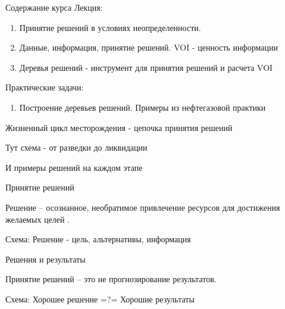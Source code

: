 \begin{frame}
    \titlepage
\end{frame}

\begin{frame}{Содержание курса}
Лекция:
\begin{enumerate}
    \item Принятие решений в условиях неопределенности. 
    \item Данные, информация, принятие решений. VOI - ценность информации
    \item Деревья решений - инструмент для принятия решений и расчета VOI
\end{enumerate}
Практические задачи:
\begin{enumerate}
	\item Построение деревьев решений. Примеры из нефтегазовой практики
\end{enumerate}
\end{frame}

\begin{frame}{Жизненный цикл месторождения - цепочка принятия решений}
	
	Тут схема - от разведки до ликвидации
	
	И примеры решений на каждом этапе	
		
	
\end{frame}

\begin{frame}{Принятие решений}
	
	Решение -- осознанное, необратимое привлечение ресурсов для достижения желаемых целей \cite{Bratvold}.
	
	Схема: Решение - цель, альтернативы, информация
	
\end{frame}

\begin{frame}{Решения и результаты}
	
	Принятие решений -- это не прогнозирование результатов.
	
	Схема: Хорошее решение =?= Хорошие результаты
	
\end{frame}

